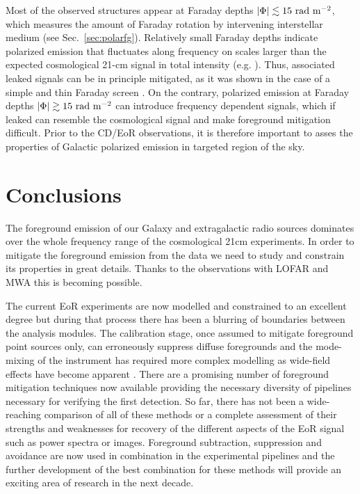 Most of the observed structures appear at Faraday depths $|\Phi|\lesssim15~{\rm rad~m^{-2}}$, which measures the amount of Faraday rotation by
intervening interstellar medium (see Sec.~\ref{sec:polarfg}). Relatively small Faraday depths indicate polarized emission that fluctuates along frequency on scales  larger than 
the expected cosmological 21-cm signal  in total intensity (e.g. \cite{moore13}). Thus, associated leaked signals can be in principle mitigated, as it was shown in the case of a simple and  thin Faraday screen \cite{geil11}. On the contrary, polarized emission at Faraday depths $|\Phi|\gtrsim15~{\rm rad~m^{-2}}$ can introduce frequency dependent signals, which if leaked can resemble the cosmological signal and make foreground mitigation difficult.  Prior to the CD/EoR observations, it is therefore important to asses the properties of Galactic polarized emission in targeted region of the sky. 



\section{Conclusions}
The foreground emission of our Galaxy and extragalactic radio sources dominates over the whole frequency range of the cosmological 21cm experiments. In order to mitigate the foreground emission from the data we need to study and constrain its properties in great details. Thanks to the observations with LOFAR and MWA this is becoming possible.

The current EoR experiments are now modelled and constrained to an excellent degree but during that process there has been a blurring of boundaries between the analysis modules. The calibration stage, once assumed to mitigate foreground point sources only, can erroneously suppress diffuse foregrounds \cite{Patil2016MNRAS.463.4317P} and the mode-mixing of the instrument has required more complex modelling as wide-field effects have become apparent \cite{Thyagarajan2015ApJ...807L..28T}. There are a promising number of foreground mitigation techniques now available providing the necessary diversity of pipelines necessary for verifying the first detection. So far, there has not been a wide-reaching comparison of all of these methods or a complete assessment of their strengths and weaknesses for recovery of the different aspects of the EoR signal such as power spectra or images. Foreground subtraction, suppression and avoidance are now used in combination in the experimental pipelines and the further development of the best combination for these methods will provide an exciting area of research in the next decade.




